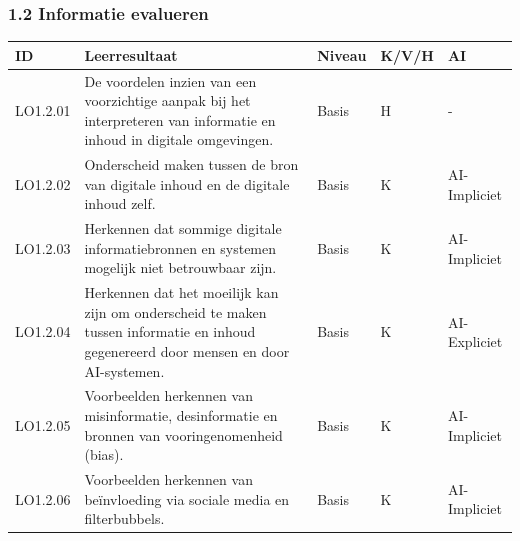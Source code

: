 \documentclass[
  dutch,
  letterpaper,
  DIV=11,
  numbers=noendperiod]{scrartcl}
\begin{document}
\subsubsection{1.2 Informatie evalueren}\label{informatie-evalueren}

\begin{longtable}[]{@{}
  >{\centering\arraybackslash}p{}
  >{\centering\arraybackslash}p{}
  >{\centering\arraybackslash}p{}
  >{\centering\arraybackslash}p{}
  >{\centering\arraybackslash}p{}@{}}
\toprule\noalign{}
\begin{minipage}[b]{\linewidth}\centering
ID
\end{minipage} & \begin{minipage}[b]{\linewidth}\centering
Leerresultaat
\end{minipage} & \begin{minipage}[b]{\linewidth}\centering
Niveau
\end{minipage} & \begin{minipage}[b]{\linewidth}\centering
K/V/H
\end{minipage} & \begin{minipage}[b]{\linewidth}\centering
AI
\end{minipage} \\
\midrule\noalign{}
\endhead
\bottomrule\noalign{}
\endlastfoot
LO1.2.01 & De voordelen inzien van een voorzichtige aanpak bij het
interpreteren van informatie en inhoud in digitale omgevingen. & Basis &
H & - \\
LO1.2.02 & Onderscheid maken tussen de bron van digitale inhoud en de
digitale inhoud zelf. & Basis & K & AI-Impliciet \\
LO1.2.03 & Herkennen dat sommige digitale informatiebronnen en systemen
mogelijk niet betrouwbaar zijn. & Basis & K & AI-Impliciet \\
LO1.2.04 & Herkennen dat het moeilijk kan zijn om onderscheid te maken
tussen informatie en inhoud gegenereerd door mensen en door AI-systemen.
& Basis & K & AI-Expliciet \\
LO1.2.05 & Voorbeelden herkennen van misinformatie, desinformatie en
bronnen van vooringenomenheid (bias). & Basis & K & AI-Impliciet \\
LO1.2.06 & Voorbeelden herkennen van beïnvloeding via sociale media en
filterbubbels. & Basis & K & AI-Impliciet \\

\end{longtable}
\end{document}
